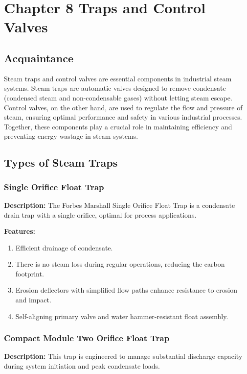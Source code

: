\section{Chapter 8 Traps and Control Valves}
\subsection{Acquaintance}
Steam traps and control valves are essential components in industrial steam systems. Steam traps are automatic valves designed to remove condensate (condensed steam and non-condensable gases) without letting steam escape. Control valves, on the other hand, are used to regulate the flow and pressure of steam, ensuring optimal performance and safety in various industrial processes. Together, these components play a crucial role in maintaining efficiency and preventing energy wastage in steam systems.

\subsection{Types of Steam Traps}
\subsubsection{Single Orifice Float Trap}

\textbf{Description:} The Forbes Marshall Single Orifice Float Trap is a condensate drain trap with a single orifice, optimal for process applications.

\textbf{Features:}
\begin{enumerate}
    \item Efficient drainage of condensate.
    \item There is no steam loss during regular operations, reducing the carbon footprint.
    \item Erosion deflectors with simplified flow paths enhance resistance to erosion and impact.
    \item Self-aligning primary valve and water hammer-resistant float assembly.
\end{enumerate}
\subsubsection{Compact Module Two Orifice Float Trap}

\textbf{Description:} This trap is engineered to manage substantial discharge capacity during system initiation and peak condensate loads.

